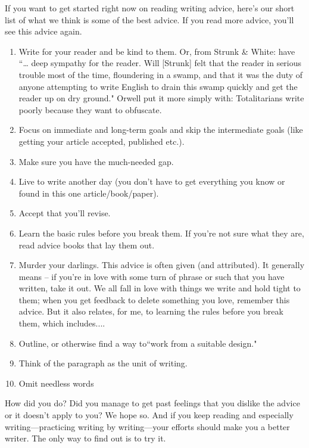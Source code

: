 \documentclass[11pt,letter]{article}
\begin{document}
If you want to get started right now on reading writing advice, here's our short list of what we think is some of the best advice. If you read more advice, you'll see this advice again.
\begin{enumerate}
\item Write for your reader and be kind to them. Or, from Strunk \& White: have ``… deep sympathy for the reader. Will [Strunk] felt that the reader in serious trouble most of the time, floundering in a swamp, and that it was the duty of anyone attempting to write English to drain this swamp quickly and get the reader up on dry ground." Orwell put it more simply with: Totalitarians write poorly because they want to obfuscate. %
\item Focus on immediate and long-term goals and skip the intermediate goals (like getting your article accepted, published etc.). %
\item Make sure you have the much-needed gap. 
\item Live to write another day (you don’t have to get everything you know or found in this one article/book/paper).
\item Accept that you’ll revise. 
\item Learn the basic rules before you break them. If you're not sure what they are, read advice books that lay them out.  %
\item Murder your darlings. This advice is often given (and attributed). It generally means – if you’re in love with some turn of phrase or such that you have written, take it out. We all fall in love with things we write and hold tight to them; when you get feedback to delete something you love, remember this advice. But it also relates, for me, to learning the rules before you break them, which includes....
\item Outline, or otherwise find a way to``work from a suitable design." %
\item Think of the paragraph as the unit of writing. 
\item Omit needless words
\end{enumerate}
How did you do? Did you manage to get past feelings that you dislike the advice or it doesn't apply to you? We hope so. And if you keep reading and especially writing---practicing writing by writing---your efforts should make you a better writer. The only way to find out is to try it. 
\end{document}
